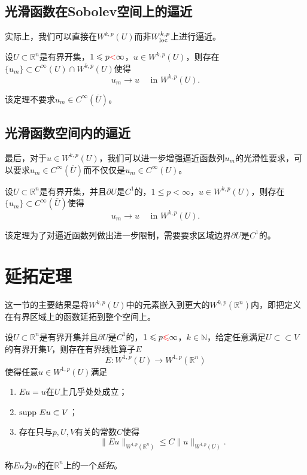 \documentclass[a4paper,10pt]{ctexart}
\begin{document}
\subsection{光滑函数在Sobolev空间上的逼近}
实际上，我们可以直接在$ W^{k,p}(U) $而非$ W^{k,p}_{\rm loc} $上进行逼近。
\begin{theorem}
    设$ U\subset \mathbb{R}^n $是有界开集，$ 1\leqslant p \textcolor{red}{<} \infty $，$ u\in W^{k,p}(U) $，则存在$ \{ u_m \}\subset C^\infty(U)\cap W^{k,p}(U) $使得
    \begin{equation}
        u_m\to u \quad \text{ in } W^{k,p}(U).
    \end{equation}
\end{theorem}
\noindent 该定理不要求$ u_m\in C^\infty (\overline{U}) $。

\subsection{光滑函数空间内的逼近}
最后，对于$ u\in W^{k,p}(U) $，我们可以进一步增强逼近函数列$ u_m $的光滑性要求，可以要求$ u_m\in C^\infty(\overline{U}) $而不仅仅是$ u_m\in C^\infty(U) $。
\begin{theorem}
    设$ U\subset \mathbb{R}^n $是有界开集，并且$ \partial U $是$ C^1 $的，$ 1\leqslant p < \infty $，$ u\in W^{k,p}(U) $，则存在$ \{ u_m \}\subset C^\infty(\overline{U}) $使得
    \begin{equation}
        u_m\to u \quad \text{ in } W^{k,p}(U).
    \end{equation}
\end{theorem}
\noindent 该定理为了对逼近函数列做出进一步限制，需要要求区域边界$ \partial U $是$ C^1 $的。

\section{延拓定理}
这一节的主要结果是将$ W^{k,p}(U) $中的元素嵌入到更大的$ W^{k,p}(\mathbb{R}^n) $内，即把定义在有界区域上的函数延拓到整个空间上。
\begin{theorem}
    设$ U\subset \mathbb{R}^n $是有界开集并且$ \partial U $是$ C^1 $的，$ 1\leqslant p \textcolor{red}{\leqslant } \infty $，$ k\in \mathbb{N} $，给定任意满足$ U\subset\subset V $的有界开集$ V $，则存在有界线性算子$ E $
    \begin{equation}
        E: W^{1,p}(U) \to W^{1,p}(\mathbb{R}^n)
    \end{equation}
    使得任意$ u\in W^{1,p}(U) $满足
    \begin{enumerate}
        \item $ Eu = u $在$ U $上几乎处处成立；
        \item $ {\rm supp}\ Eu \subset V $；
        \item 存在只与$ p,U,V $有关的常数$ C $使得
        \begin{equation}
            \| Eu \|_{W^{1,p}(\mathbb{R}^n)} \leqslant C \| u \|_{W^{1,p}(U)}.
        \end{equation}
    \end{enumerate}
\end{theorem}
\noindent 称$ Eu $为$ u $的在$ \mathbb{R}^n $上的一个\emph{延拓}。
\end{document}
